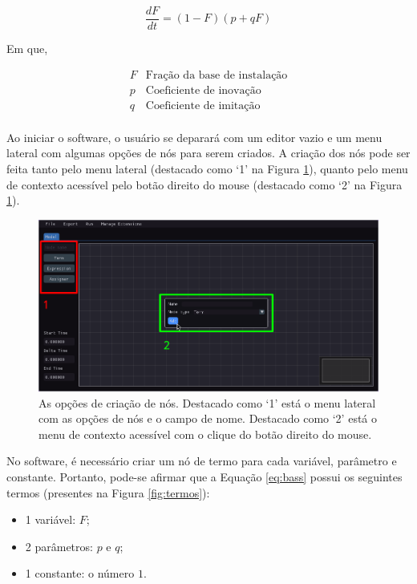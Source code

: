 \documentclass[
	12pt,				%
	openright,			%
	oneside,			%
	a4paper,			%
	main=brazil,
	english,			%
	]{ufsj-abntex2}
\begin{document}
\begin{equation}\label{eq:bass}
    \frac{dF}{dt} = (1 - F)(p + qF)
\end{equation}

Em que,

\[
    \begin{array}{lr}
    F & \text{Fração da base de instalação}\\
    p & \text{Coeficiente de inovação}\\
    q & \text{Coeficiente de imitação}\\
    \end{array}
\]

Ao iniciar o software, o usuário se deparará com um editor vazio e um menu lateral com algumas opções de nós para serem criados. A criação dos nós pode ser feita tanto pelo menu lateral (destacado como `1' na Figura \ref{fig:criando-nos}), quanto pelo menu de contexto acessível pelo botão direito do mouse (destacado como `2' na Figura \ref{fig:criando-nos}).

\begin{figure}[h]
    \centering
    \includegraphics[width=\textwidth]{imgs/ode-designer/passo-a-passo/criando-nos.png} 
    \caption{As opções de criação de nós. Destacado como `1' está o menu lateral com as opções de nós e o campo de nome. Destacado como `2' está o menu de contexto acessível com o clique do botão direito do mouse.}
    \label{fig:criando-nos}
\end{figure}

No software, é necessário criar um nó de termo para cada variável, parâmetro e constante. Portanto, pode-se afirmar que a Equação \ref{eq:bass} possui os seguintes termos (presentes na Figura \ref{fig:termos}):

\begin{itemize}
    \item 1 variável: $F$;
    \item 2 parâmetros: $p$ e $q$;
    \item 1 constante: o número $1$.
\end{itemize}
\end{document}
